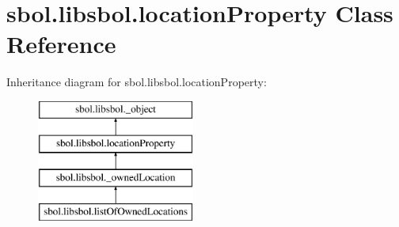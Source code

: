 \hypertarget{classsbol_1_1libsbol_1_1location_property}{}\section{sbol.\+libsbol.\+location\+Property Class Reference}
\label{classsbol_1_1libsbol_1_1location_property}
Inheritance diagram for sbol.\+libsbol.\+location\+Property\+:\begin{figure}[H]
\begin{center}
\leavevmode
\includegraphics[height=4.000000cm]{classsbol_1_1libsbol_1_1location_property}
\end{center}
\end{figure}
